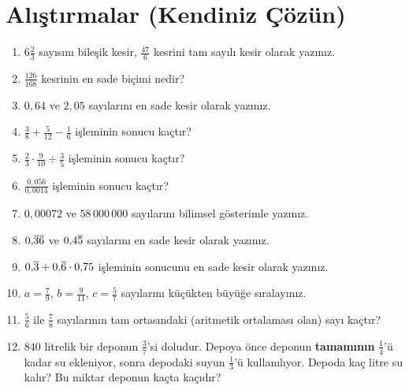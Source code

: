 \kendinizoncesi
\section{Alıştırmalar (Kendiniz Çözün)}

\begin{enumerate}[label=\textbf{\arabic*.},leftmargin=*,itemsep=3pt]
\item \(6\tfrac{2}{3}\) sayısını bileşik kesir, \(\tfrac{47}{6}\) kesrini tam sayılı kesir olarak yazınız.
\item \(\tfrac{126}{168}\) kesrinin en sade biçimi nedir?
\item \(0{,}64\) ve \(2{,}05\) sayılarını en sade kesir olarak yazınız.
\item \(\tfrac{3}{8}+\tfrac{5}{12}-\tfrac{1}{6}\) işleminin sonucu kaçtır?
\item \(\tfrac{2}{3}\cdot\tfrac{9}{10}\div\tfrac{3}{5}\) işleminin sonucu kaçtır?
\item \(\tfrac{0{,}056}{0{,}0014}\) işleminin sonucu kaçtır?
\item \(0{,}00072\) ve \(58\,000\,000\) sayılarını bilimsel gösterimle yazınız.
\item \(0{,}\overline{36}\) ve \(0{,}4\overline{5}\) sayılarını en sade kesir olarak yazınız.
\item \(0{,}\overline{3}+0{,}\overline{6}\cdot 0{,}75\) işleminin sonucunu en sade kesir olarak yazınız.
\item \(a=\tfrac{7}{9}\), \(b=\tfrac{9}{11}\), \(c=\tfrac{5}{7}\) sayılarını küçükten büyüğe sıralayınız.
\item \(\tfrac{5}{6}\) ile \(\tfrac{7}{8}\) sayılarının tam ortasındaki (aritmetik ortalaması olan) sayı kaçtır?
\item \(840\) litrelik bir deponun \(\frac{3}{7}\)'si doludur. Depoya önce deponun \textbf{tamamının} \(\frac{1}{4}\)'ü kadar su ekleniyor, sonra depodaki suyun \(\frac{1}{3}\)'ü kullanılıyor. Depoda kaç litre su kalır? Bu miktar deponun kaçta kaçıdır?
\end{enumerate}

